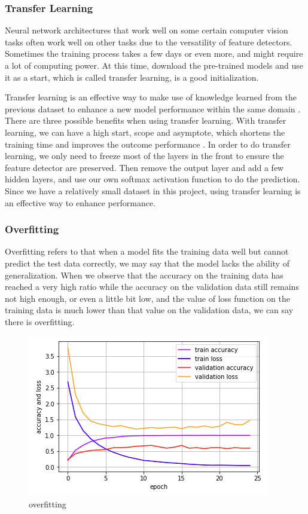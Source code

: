\documentclass{article}
\begin{document}
\subsubsection{Transfer Learning}

Neural network architectures that work well on some certain computer vision tasks often work well on other tasks due to the versatility of feature detectors. Sometimes the training process takes a few days or even more, and might require a lot of computing power. At this time, download the pre-trained models and use it as a start, which is called transfer learning, is a good initialization. 

Transfer learning is an effective way to make use of knowledge learned from the previous dataset to enhance a new model performance within the same domain \cite{day2017survey}. There are three possible benefits when using transfer learning. With transfer learning, we can have a high start, scope and asymptote, which shortens the training time and improves the outcome performance \cite{olivas2009handbook}. In order to do transfer learning, we only need to freeze most of the layers in the front to ensure the feature detector are preserved. Then remove the output layer and add a few hidden layers, and use our own softmax activation function to do the prediction. Since we have a relatively small dataset in this project, using transfer learning is an effective way to enhance performance.

\subsubsection{Overfitting}

Overfitting refers to that when a model fits the training data well but cannot predict the test data correctly, we may say that the model lacks the ability of generalization. When we observe that the accuracy on the training data has reached a very high ratio while the accuracy on the validation data still remains not high enough, or even a little bit low, and the value of loss function on the training data is much lower than that value on the validation data, we can say there is overfitting.

\begin{figure}[h]
\centering
\includegraphics[scale=0.5]{Overfitting.png}
\caption{overfitting}
\label{fig:Overfitting.png}
\end{figure}
\end{document}
